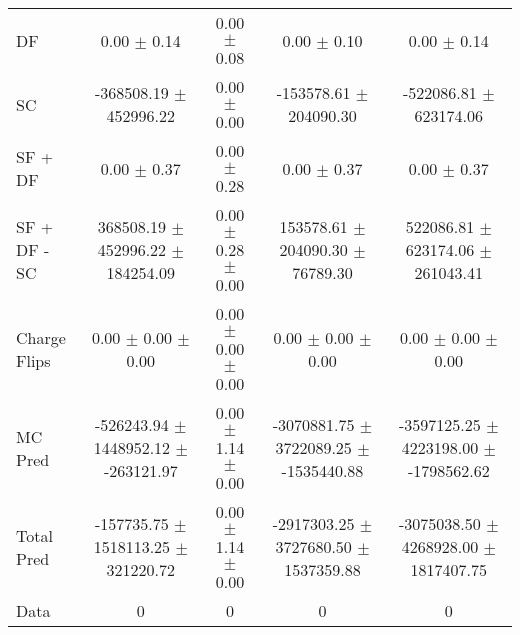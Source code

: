 \begin{tabular}{l|cccc}
                                 DF &  0.00 $\pm$  0.14 &  0.00 $\pm$  0.08 &  0.00 $\pm$  0.10 &  0.00 $\pm$  0.14 \\
                                 SC & -368508.19 $\pm$ 452996.22 &  0.00 $\pm$  0.00 & -153578.61 $\pm$ 204090.30 & -522086.81 $\pm$ 623174.06 \\
                            SF + DF &  0.00 $\pm$  0.37 &  0.00 $\pm$  0.28 &  0.00 $\pm$  0.37 &  0.00 $\pm$  0.37 \\
\hline
                       SF + DF - SC & 368508.19 $\pm$ 452996.22 $\pm$ 184254.09 &  0.00 $\pm$  0.28 $\pm$  0.00 & 153578.61 $\pm$ 204090.30 $\pm$ 76789.30 & 522086.81 $\pm$ 623174.06 $\pm$ 261043.41 \\
\hline\hline
                       Charge Flips &  0.00 $\pm$  0.00 $\pm$  0.00 &  0.00 $\pm$  0.00 $\pm$  0.00 &  0.00 $\pm$  0.00 $\pm$  0.00 &  0.00 $\pm$  0.00 $\pm$  0.00 \\
\hline
                            MC Pred & -526243.94 $\pm$ 1448952.12 $\pm$ -263121.97 &  0.00 $\pm$  1.14 $\pm$  0.00 & -3070881.75 $\pm$ 3722089.25 $\pm$ -1535440.88 & -3597125.25 $\pm$ 4223198.00 $\pm$ -1798562.62 \\
\hline
                         Total Pred & -157735.75 $\pm$ 1518113.25 $\pm$ 321220.72 &  0.00 $\pm$  1.14 $\pm$  0.00 & -2917303.25 $\pm$ 3727680.50 $\pm$ 1537359.88 & -3075038.50 $\pm$ 4268928.00 $\pm$ 1817407.75 \\
\hline\hline
                               Data &     0 &     0 &     0 &     0 \\
\hline\hline
\end{tabular}

